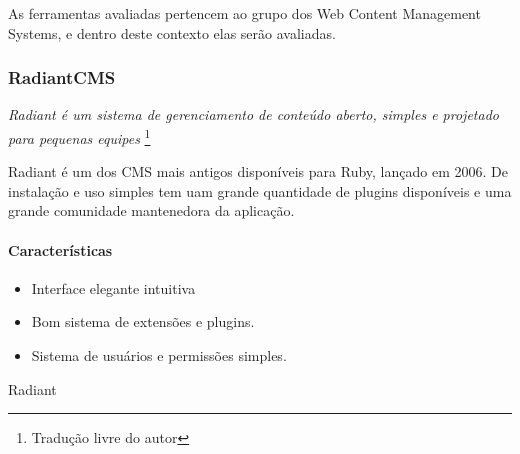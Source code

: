 As ferramentas avaliadas pertencem ao grupo dos Web Content Management Systems, e dentro deste contexto elas serão avaliadas.

\subsubsection{RadiantCMS}

\emph{Radiant é um sistema de gerenciamento de conteúdo aberto, simples e projetado para pequenas equipes}
\cite{radiant_website}\footnote{Tradução livre do autor}

Radiant é um dos CMS mais antigos disponíveis para Ruby, lançado em 2006. De instalação e uso simples tem uam grande quantidade de plugins disponíveis e uma grande comunidade mantenedora da aplicação.

\paragraph{Características}

\begin{itemize}
  \item Interface elegante intuitiva
  \item Bom sistema de extensões e plugins.
  \item Sistema de usuários e permissões simples.
\end{itemize}

Radiant 

















